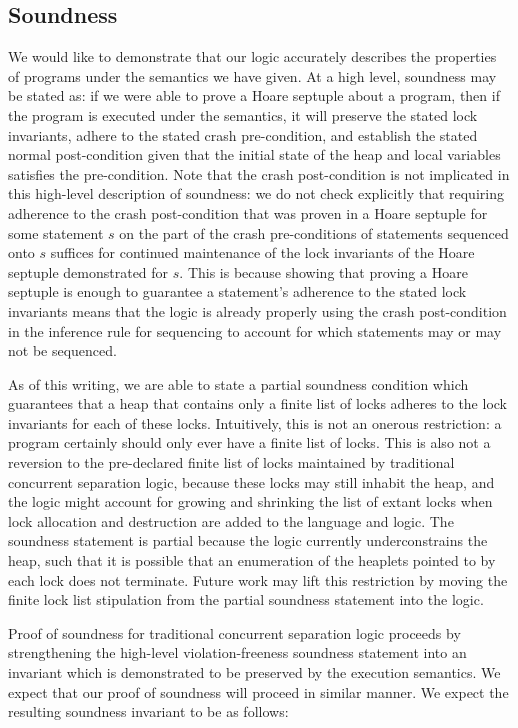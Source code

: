 \subsection{Soundness}
We would like to demonstrate that our logic accurately describes the properties
of programs under the semantics we have given.
At a high level, soundness may
be stated as: if we were able to prove a Hoare septuple about a program,
then if the program is executed under the semantics,
it will preserve the stated lock invariants,
adhere to the stated crash pre-condition,
and establish the stated normal post-condition
given that the initial state of the heap and local variables
satisfies the pre-condition.
Note that the crash post-condition is not implicated in this high-level
description of soundness:
we do not check explicitly that requiring adherence to the crash post-condition
that was proven in a Hoare septuple for some statement $s$
on the part of the crash pre-conditions of statements sequenced onto $s$
suffices for continued maintenance of the lock invariants
of the Hoare septuple demonstrated for $s$.
This is because showing that proving a Hoare septuple is enough
to guarantee a statement's adherence to the stated lock invariants
means that the logic is already properly using the crash post-condition
in the inference rule for sequencing
to account for which statements may or may not be sequenced.

As of this writing, we are able to state a partial soundness condition
which guarantees that a heap that contains only a finite list of locks
adheres to the lock invariants for each of these locks.
Intuitively, this is not an onerous restriction:
a program certainly should only ever have a finite list of locks.
This is also not a reversion to the pre-declared finite list of locks
maintained by traditional concurrent separation logic, because these locks may
still inhabit the heap, and the logic might account for growing and shrinking
the list of extant locks when lock allocation and destruction are
added to the language and logic.
The soundness statement is partial because the logic currently underconstrains
the heap, such that
it is possible that an enumeration of the heaplets pointed to by each lock
does not terminate.
Future work may lift this restriction by
moving the finite lock list stipulation from the partial soundness statement
into the logic.

Proof of soundness for traditional concurrent separation logic proceeds by
strengthening the high-level violation-freeness soundness statement into
an invariant which is demonstrated to be preserved by the execution semantics.
We expect that our proof of soundness will proceed in similar manner.
We expect the resulting soundness invariant to be as follows:

